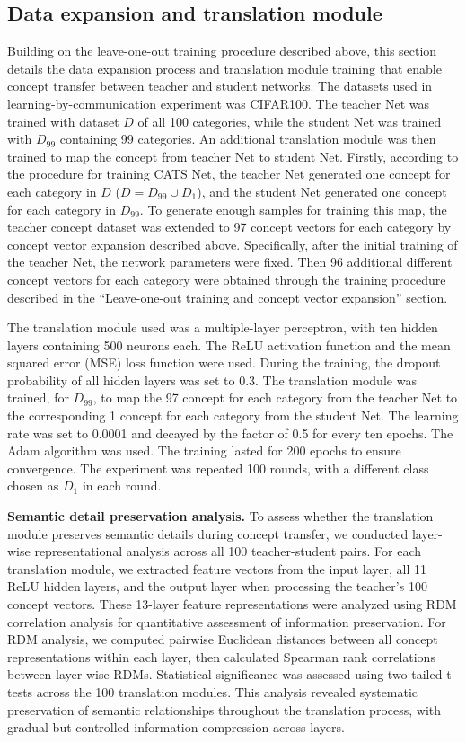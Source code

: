 \documentclass[pdflatex,sn-mathphys-num,lineno]{sn-jnl}%
\begin{document}
\begin{CJK}{UTF8}{gbsn}
\subsection{Data expansion and translation module}
Building on the leave-one-out training procedure described above, this section details the data expansion process and translation module training that enable concept transfer between teacher and student networks. The datasets used in learning-by-communication experiment was CIFAR100. The teacher Net was trained with dataset $D$ of all 100 categories, while the student Net was trained with $D_{99}$ containing 99 categories. An additional translation module was then trained to map the concept from teacher Net to student Net. Firstly, according to the procedure for training CATS Net, the teacher Net generated one concept for each category in $D$ ($D = D_{99} \cup D_1$), and the student Net generated one concept for each category in $D_{99}$. To generate enough samples for training this map, the teacher concept dataset was extended to 97 concept vectors for each category by concept vector expansion described above. Specifically, after the initial training of the teacher Net, the network parameters were fixed. Then 96 additional different concept vectors for each category were obtained through the training procedure described in the “Leave-one-out training and concept vector expansion” section. 

The translation module used was a multiple-layer perceptron, with ten hidden layers containing 500 neurons each. The ReLU activation function and the mean squared error (MSE) loss function were used. During the training, the dropout probability of all hidden layers was set to 0.3. The translation module was trained, for $D_{99}$, to map the 97 concept for each category from the teacher Net to the corresponding 1 concept for each category from the student Net. The learning rate was set to 0.0001 and decayed by the factor of 0.5 for every ten epochs. The Adam \cite{kingma_adam_2015} algorithm was used. The training lasted for 200 epochs to ensure convergence. The experiment was repeated 100 rounds, with a different class chosen as $D_1$ in each round.

\textbf{Semantic detail preservation analysis.} To assess whether the translation module preserves semantic details during concept transfer, we conducted layer-wise representational analysis across all 100 teacher-student pairs. For each translation module, we extracted feature vectors from the input layer, all 11 ReLU hidden layers, and the output layer when processing the teacher's 100 concept vectors. These 13-layer feature representations were analyzed using RDM correlation analysis for quantitative assessment of information preservation. For RDM analysis, we computed pairwise Euclidean distances between all concept representations within each layer, then calculated Spearman rank correlations between layer-wise RDMs. Statistical significance was assessed using two-tailed t-tests across the 100 translation modules. This analysis revealed systematic preservation of semantic relationships throughout the translation process, with gradual but controlled information compression across layers.


\end{CJK}
\end{document}
